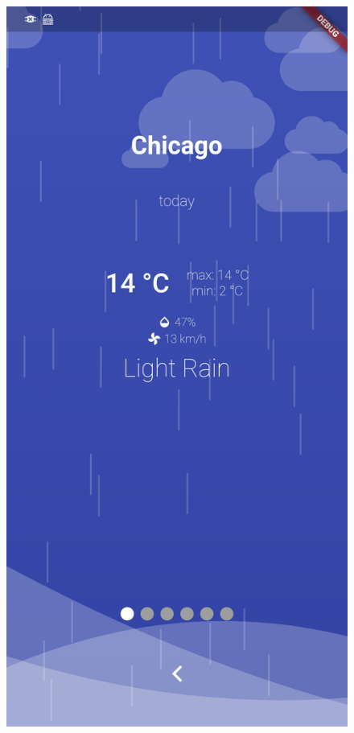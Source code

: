 \documentclass[12pt, a4paper]{article}
\begin{document}
\begin{figure}[!htb]
  \includegraphics[width=\linewidth]{img/app-rain.jpg}

\end{figure}
\end{document}
